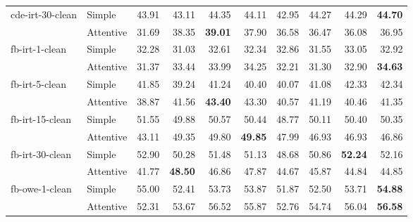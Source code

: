 \begin{tabular}{| l | l | r || r | r | r | r | r | r | r |}
    \multirow{2}{*}{cde-irt-30-clean}
    & Simple    & 43.91 & 43.11 & 44.35 & 44.11 & 42.95 & 44.27 & 44.29 & \textbf{44.70} \\
    & Attentive & 31.69 & 38.35 & \textbf{39.01} & 37.90 & 36.58 & 36.47 & 36.08 & 36.95 \\ \hline \hline

    \multirow{2}{*}{fb-irt-1-clean}
    & Simple    & 32.28 & 31.03 & 32.61 & 32.34 & 32.86 & 31.55 & 33.05 & 32.92 \\
    & Attentive & 31.37 & 33.44 & 33.99 & 34.25 & 32.21 & 31.30 & 32.90 & \textbf{34.63} \\ \hline

    \multirow{2}{*}{fb-irt-5-clean}
    & Simple    & 41.85 & 39.24 & 41.24 & 40.40 & 40.07 & 41.08 & 42.33 & 42.34 \\
    & Attentive & 38.87 & 41.56 & \textbf{43.40} & 43.30 & 40.57 & 41.19 & 40.46 & 41.35 \\ \hline

    \multirow{2}{*}{fb-irt-15-clean}
    & Simple    & 51.55 & 49.88 & 50.57 & 50.44 & 48.77 & 50.11 & 50.40 & 50.35 \\
    & Attentive & 43.11 & 49.35 & 49.80 & \textbf{49.85} & 47.99 & 46.93 & 46.93 & 46.86 \\ \hline

    \multirow{2}{*}{fb-irt-30-clean}
    & Simple    & 52.90 & 50.28 & 51.48 & 51.13 & 48.68 & 50.86 & \textbf{52.24} & 52.16 \\
    & Attentive & 41.77 & \textbf{48.50} & 46.86 & 47.87 & 44.67 & 45.87 & 44.84 & 44.85 \\ \hline

    \multirow{2}{*}{fb-owe-1-clean}
    & Simple    & 55.00 & 52.41 & 53.73 & 53.87 & 51.87 & 52.50 & 53.71 & \textbf{54.88} \\
    & Attentive & 52.31 & 53.67 & 56.52 & 55.87 & 52.76 & 54.74 & 56.04 & \textbf{56.58} \\ \hline

\end{tabular}
